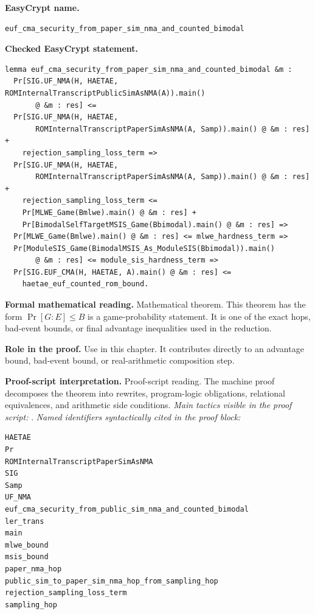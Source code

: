 \begin{formaltheorem}
\noindent\textbf{EasyCrypt name.}
\begin{lstlisting}[language=EasyCrypt,basicstyle=\ttfamily\scriptsize]
euf_cma_security_from_paper_sim_nma_and_counted_bimodal
\end{lstlisting}
\noindent\textbf{Checked EasyCrypt statement.}
\begin{lstlisting}[language=EasyCrypt,basicstyle=\ttfamily\scriptsize]
lemma euf_cma_security_from_paper_sim_nma_and_counted_bimodal &m :
  Pr[SIG.UF_NMA(H, HAETAE, ROMInternalTranscriptPublicSimAsNMA(A)).main()
       @ &m : res] <=
  Pr[SIG.UF_NMA(H, HAETAE,
       ROMInternalTranscriptPaperSimAsNMA(A, Samp)).main() @ &m : res] +
    rejection_sampling_loss_term =>
  Pr[SIG.UF_NMA(H, HAETAE,
       ROMInternalTranscriptPaperSimAsNMA(A, Samp)).main() @ &m : res] +
    rejection_sampling_loss_term <=
    Pr[MLWE_Game(Bmlwe).main() @ &m : res] +
    Pr[BimodalSelfTargetMSIS_Game(Bbimodal).main() @ &m : res] =>
  Pr[MLWE_Game(Bmlwe).main() @ &m : res] <= mlwe_hardness_term =>
  Pr[ModuleSIS_Game(BimodalMSIS_As_ModuleSIS(Bbimodal)).main()
       @ &m : res] <= module_sis_hardness_term =>
  Pr[SIG.EUF_CMA(H, HAETAE, A).main() @ &m : res] <=
    haetae_euf_counted_rom_bound.
\end{lstlisting}
\noindent\textbf{Formal mathematical reading.}
Mathematical theorem. This theorem has the form \(\Pr[G:E] \le B\) is a game-probability statement.  It is one of the exact hops, bad-event bounds, or final advantage inequalities used in the reduction.

\noindent\textbf{Role in the proof.}
Use in this chapter. It contributes directly to an advantage bound, bad-event bound, or real-arithmetic composition step.

\noindent\textbf{Proof-script interpretation.}
Proof-script reading. The machine proof decomposes the theorem into rewrites, program-logic obligations, relational equivalences, and arithmetic side conditions.
\emph{Main tactics visible in the proof script:} .
\emph{Named identifiers syntactically cited in the proof block:}
\begin{lstlisting}[language=EasyCrypt,basicstyle=\ttfamily\scriptsize]
HAETAE
Pr
ROMInternalTranscriptPaperSimAsNMA
SIG
Samp
UF_NMA
euf_cma_security_from_public_sim_nma_and_counted_bimodal
ler_trans
main
mlwe_bound
msis_bound
paper_nma_hop
public_sim_to_paper_sim_nma_hop_from_sampling_hop
rejection_sampling_loss_term
sampling_hop
\end{lstlisting}

\end{formaltheorem}

